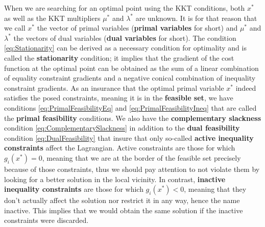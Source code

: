 \documentclass[12pt, a4paper]{article}
\begin{document}
When we are searching for an optimal point using the KKT conditions, both \( x^*\) as well as the KKT multipliers \( \mu^*\) and \( \lambda^*\) are unknown. It is for that reason that we call \( x^*\) the vector of primal variables (\textbf{primal variables} for short) and \( \mu^*\) and \( \lambda^*\) the vectors of dual variables (\textbf{dual variables} for short). The condition \eqref{eq:Stationarity} can be derived as a necessary condition for optimality and is called the \textbf{stationarity} condition; it implies that the gradient of the cost function at the optimal point can be obtained as the sum of a linear combination of equality constraint gradients and a negative conical combination of inequality constraint gradients. As an insurance that the optimal primal variable \( x^*\) indeed satisfies the posed constraints, meaning it is in the \textbf{feasible set}, we have conditions \eqref{eq:PrimalFeasibilityEq} and \eqref{eq:PrimalFeasibilityIneq} that are called the \textbf{primal feasibility} conditions. We also have the \textbf{complementary slackness} condition \eqref{eq:ComplementarySlackness} in addition to the \textbf{dual feasibility} condition \eqref{eq:DualFeasibility} that insure that only so-called \textbf{active inequality constraints} affect the Lagrangian. Active constraints are those for which \( g_i(x^*)=0 \), meaning that we are at the border of the feasible set precisely because of those constraints, thus we should pay attention to not violate them by looking for a better solution in the local vicinity. In contrast, \textbf{inactive inequality constraints} are those for which \( g_i(x^*) < 0 \), meaning that they don't actually affect the solution nor restrict it in any way, hence the name inactive. This implies that we would obtain the same solution if the inactive constraints were discarded. \par

\end{document}
